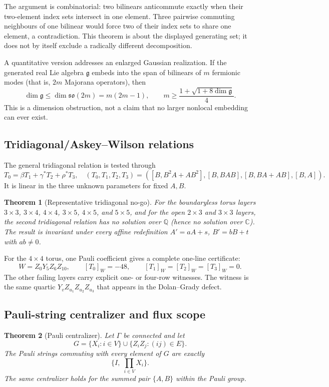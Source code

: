 \documentclass[11pt]{article}
\newtheorem{theorem}{Theorem}[section]
\newcommand{\g}{\mathfrak g}
\newcommand{\Q}{\mathbb Q}
\newcommand{\C}{\mathbb C}
\begin{document}
The argument is combinatorial: two bilinears anticommute exactly when their two-element index sets intersect in one element. Three pairwise commuting neighbours of one bilinear would force two of their index sets to share one element, a contradiction. This theorem is about the displayed generating set; it does not by itself exclude a radically different decomposition.

A quantitative version addresses an enlarged Gaussian realization. If the generated real Lie algebra $\g$ embeds into the span of bilinears of $m$ fermionic modes (that is, $2m$ Majorana operators), then
\[
 \dim\g\leq\dim\mathfrak{so}(2m)=m(2m-1),\qquad
 m\geq\frac{1+\sqrt{1+8\dim\g}}4.
\]
This is a dimension obstruction, not a claim that no larger nonlocal embedding can ever exist.

\subsection{Tridiagonal/Askey--Wilson relations}
The general tridiagonal relation is tested through
\[
T_0=\beta T_1+\gamma^*T_2+\rho^*T_3,
\quad
(T_0,T_1,T_2,T_3)=([B,B^2A+AB^2],[B,BAB],[B,BA+AB],[B,A]).
\]
It is linear in the three unknown parameters for fixed $A,B$.

\begin{theorem}[Representative tridiagonal no-go]
For the boundaryless torus layers $3\times3$, $3\times4$, $4\times4$, $3\times5$, $4\times5$, and $5\times5$, and for the open $2\times3$ and $3\times3$ layers, the second tridiagonal relation has no solution over $\Q$ (hence no solution over $\C$). The result is invariant under every affine redefinition $A'=aA+s$, $B'=bB+t$ with $ab\neq0$.
\end{theorem}

For the $4\times4$ torus, one Pauli coefficient gives a complete one-line certificate:
\[
 W=Z_0Y_5Z_6Z_{10},\qquad [T_0]_W=-48,
 \qquad [T_1]_W=[T_2]_W=[T_3]_W=0.
\]
The other failing layers carry explicit one- or four-row witnesses. The witness is the same quartic $Y_vZ_{u_1}Z_{u_2}Z_{u_3}$ that appears in the Dolan--Grady defect.

\subsection{Pauli-string centralizer and flux scope}
\begin{theorem}[Pauli centralizer]
Let $\Gamma$ be connected and let
\[
 G=\{X_i:i\in V\}\cup\{Z_iZ_j:(ij)\in E\}.
\]
The Pauli strings commuting with every element of $G$ are exactly
\[
 \{I,\;\prod_{i\in V}X_i\}.
\]
The same centralizer holds for the summed pair $\{A,B\}$ within the Pauli group.
\end{theorem}
\end{document}
